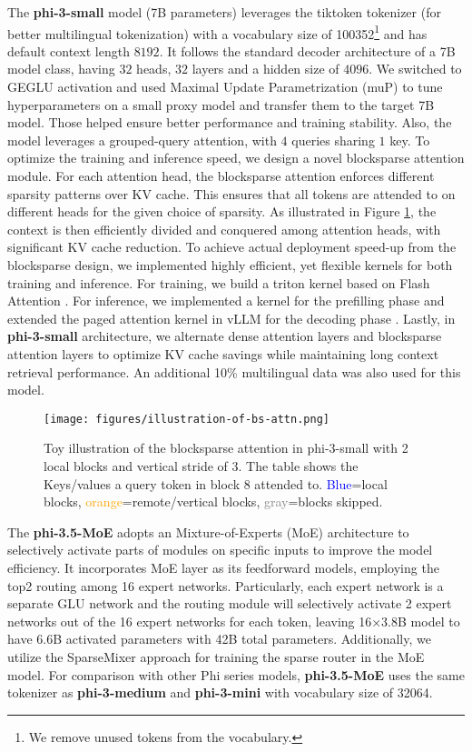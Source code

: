  
The \textbf{phi-3-small} model (7B parameters) leverages the tiktoken tokenizer (for better multilingual tokenization) with a vocabulary size of 100352\footnote{We remove unused tokens from the vocabulary.} and has default context length $8192$. 
It follows the standard decoder architecture of a 7B model class, having $32$ heads, $32$ layers and a hidden size of $4096$. We switched to GEGLU activation and used Maximal Update Parametrization (muP) \cite{yang2022tensor} to tune hyperparameters on a small proxy model and transfer them to the target 7B model. Those helped ensure better performance and training stability. 
Also, the model leverages a grouped-query attention, with $4$ queries sharing $1$ key. 
To optimize the training and inference speed, we design a novel blocksparse attention module.
For each attention head, the blocksparse attention enforces different sparsity patterns over KV cache. This ensures that all tokens are attended to on different heads for the given choice of sparsity.
As illustrated in Figure \ref{fig:bs-atn-illustration}, the context is then efficiently divided and conquered among attention heads, with significant KV cache reduction.
To achieve actual deployment speed-up from the blocksparse design, we implemented highly efficient, yet flexible kernels for both training and inference.
For training, we build a triton kernel based on Flash Attention \cite{dao2022flashattention}.
For inference, we implemented a kernel for the prefilling phase and extended the
paged attention kernel in vLLM for the decoding phase \cite{kwon2023efficient}.
Lastly, in \textbf{phi-3-small} architecture, we alternate dense attention layers and blocksparse attention layers to optimize KV cache savings  while maintaining long context retrieval performance.
An additional 10\% multilingual data was also used for this model.

\begin{figure}[!h]
    \centering
    \texttt{[image: figures/illustration-of-bs-attn.png]}
    \caption{Toy illustration of the blocksparse attention in phi-3-small with 2 local blocks and vertical stride of 3. The table shows the Keys/values a query token in block 8 attended to. \textcolor{blue}{Blue}=local blocks, \textcolor{orange}{orange}=remote/vertical blocks, \textcolor{gray}{gray}=blocks skipped.}
    \label{fig:bs-atn-illustration}
\end{figure}

The \textbf{phi-3.5-MoE} adopts an Mixture-of-Experts (MoE) architecture to selectively activate parts of
modules on specific inputs to improve the model efficiency. It incorporates
MoE layer as its feedforward models, employing the top2 routing among 16 expert networks.
Particularly, each expert network is a separate GLU network and the routing module will
selectively activate 2 expert networks out of the 16 expert networks for each token, leaving
 16×3.8B model to have 6.6B activated parameters with 42B total parameters. Additionally, we utilize the SparseMixer approach \cite{Liu2023SparseMixer, Liu2023BridgingDA} for training the sparse router in the MoE model. For comparison with other Phi series models, \textbf{phi-3.5-MoE} uses the same tokenizer as \textbf{phi-3-medium} and \textbf{phi-3-mini} with vocabulary size of 32064.  
 

